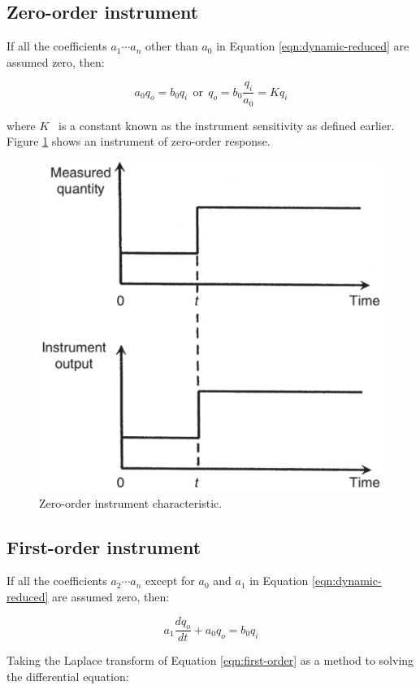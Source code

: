 \documentclass[a4paper,11pt,dvipsnames]{book}
\begin{document}
\subsection*{Zero-order instrument}

If all the coefficients $a_1 \cdots a_n$ other than $a_0$ in Equation \ref{eqn:dynamic-reduced} are assumed zero, then: 

\begin{equation}\label{eqn:zero-order}
a_0 q_o = b_0 q_i ~~\text{or}~~ q_o = b_0 \frac{q_i}{a_0} = K q_i 
\end{equation}

where $K$~ is a constant known as the instrument sensitivity as defined earlier. Figure \ref{fig:zero-order} shows an instrument of zero-order response.

\begin{figure}[h!]\label{fig:zero-order}
\centering
  \includegraphics[width=0.7\linewidth]{zero-order}
  \caption{Zero-order instrument characteristic.} 
\end{figure}


\subsection*{First-order instrument}

If all the coefficients $a_2 \cdots a_n$ except for $a_0$ and $a_1$ in Equation \ref{eqn:dynamic-reduced} are assumed zero, then: 

\begin{equation}\label{eqn:first-order}
a_1 \frac{dq_o}{dt} + a_0 q_o = b_0 q_i  
\end{equation}

Taking the Laplace transform of Equation \ref{eqn:first-order} as a method to solving the differential equation:
\end{document}
